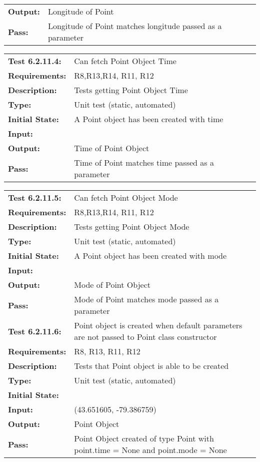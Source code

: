 \documentclass[12pt, titlepage]{article}
\begin{document}
{\begin{tabular}{|l|p{10cm}|}
    \bf{Output}: & Longitude of Point\\
    \bf{Pass}: & Longitude of Point matches longitude passed as a parameter \\
    \hline
\end{tabular}
\begin{tabular}{|l|p{10cm}|}
    \hline
    \bf{Test} 6.2.11.4: & Can fetch Point Object Time\\
    \bf{Requirements}: &  R8,R13,R14, R11, R12\\
    \bf{Description}: & Tests getting Point Object Time\\
    \bf{Type}: & Unit test (static, automated) \\
    \bf{Initial State}: & A Point object has been created with time\\
    \bf{Input}: & \\
    \bf{Output}: & Time of Point Object\\
    \bf{Pass}: & Time of Point matches time passed as a parameter \\
    \hline
\end{tabular}
\begin{tabular}{|l|p{10cm}|}
    \hline
    \bf{Test} 6.2.11.5: & Can fetch Point Object Mode\\
    \bf{Requirements}: &  R8,R13,R14, R11, R12\\
    \bf{Description}: & Tests getting Point Object Mode\\
    \bf{Type}: & Unit test (static, automated) \\
    \bf{Initial State}: & A Point object has been created with mode\\
    \bf{Input}: & \\
    \bf{Output}: & Mode of Point Object\\
    \bf{Pass}: & Mode of Point matches mode passed as a parameter \\
    \hline
    \hline
    \bf{Test} 6.2.11.6: & Point object is created when default parameters are not passed to Point class constructor\\
    \bf{Requirements}: & R8, R13, R11, R12\\
    \bf{Description}: & Tests that Point object is able to be created\\
    \bf{Type}: & Unit test (static, automated) \\
    \bf{Initial State}: & \\
    \bf{Input}: & (43.651605, -79.386759) \\
    \bf{Output}: & Point Object\\
    \bf{Pass}: & Point Object created of type Point with point.time = None and point.mode = None \\
    \hline
\end{tabular}}
\end{document}
